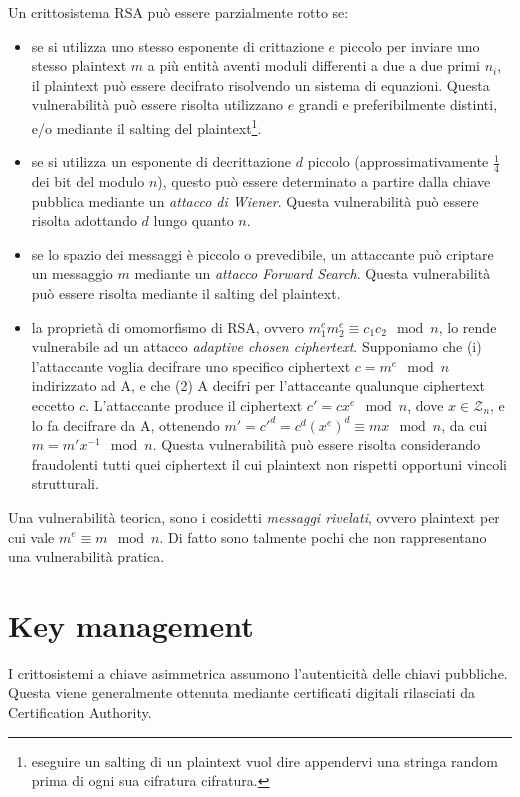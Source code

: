 Un crittosistema RSA può essere parzialmente rotto se:
\begin{itemize}
  \item se si utilizza uno stesso esponente di crittazione $e$ piccolo per inviare uno stesso plaintext $m$ a più entità aventi moduli differenti a due a due primi $n_{i}$, il plaintext può essere decifrato risolvendo un sistema di equazioni. Questa vulnerabilità può essere risolta utilizzano $e$ grandi e preferibilmente distinti, e/o mediante il salting del plaintext\footnote{eseguire un salting di un plaintext vuol dire appendervi una stringa random prima di ogni sua cifratura cifratura.}.

  \item se si utilizza un esponente di decrittazione $d$ piccolo (approssimativamente $\frac{1}{4}$ dei bit del modulo $n$), questo può essere determinato a partire dalla chiave pubblica mediante un \textit{attacco di Wiener}. Questa vulnerabilità può essere risolta adottando $d$ lungo quanto $n$.

  \item se lo spazio dei messaggi è piccolo o prevedibile, un attaccante può criptare un messaggio $m$ mediante un \textit{attacco Forward Search}. Questa vulnerabilità può essere risolta mediante il salting del plaintext.

  \item la proprietà di omomorfismo di RSA, ovvero $m_{1}^{e}m_{2}^{e} \equiv c_{1}c_{2} \mod n$, lo rende vulnerabile ad un attacco \textit{adaptive chosen ciphertext}.
  Supponiamo che (i) l'attaccante voglia decifrare uno specifico ciphertext $c=m^{e} \mod n$ indirizzato ad A, e che (2) A decifri per l'attaccante qualunque ciphertext eccetto $c$. L'attaccante produce il ciphertext $c'=cx^{e} \mod n$, dove $x\in\mathcal{Z}_{n}$, e lo fa decifrare da A, ottenendo $m'=c'^{d}=c^{d}(x^{e})^{d}\equiv mx \mod n$, da cui $m=m'x^{-1} \mod n$.
  Questa vulnerabilità può essere risolta considerando fraudolenti tutti quei ciphertext il cui plaintext non rispetti opportuni vincoli strutturali.
\end{itemize}

Una vulnerabilità teorica, sono i cosidetti \textit{messaggi rivelati}, ovvero plaintext per cui vale $m^{e} \equiv m \mod n$. Di fatto sono talmente pochi che non rappresentano una vulnerabilità pratica.

\section{Key management}
I crittosistemi a chiave asimmetrica assumono l'autenticità delle chiavi pubbliche. Questa viene generalmente ottenuta mediante certificati digitali rilasciati da Certification Authority.

